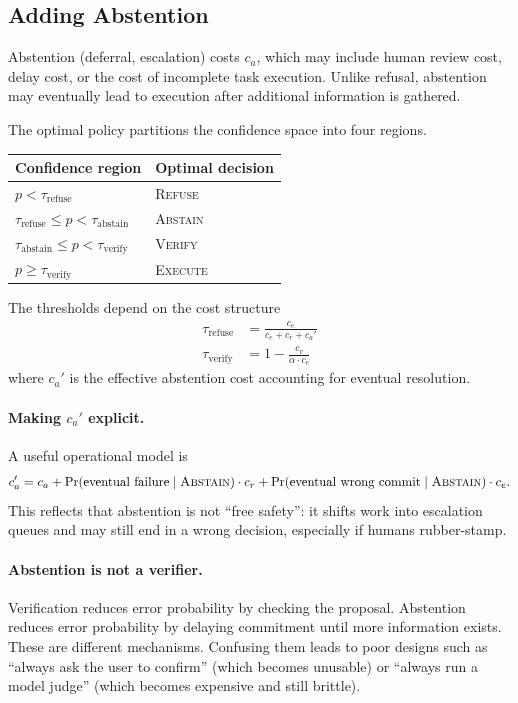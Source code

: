 \subsection{Adding Abstention}

Abstention (deferral, escalation) costs $c_a$, which may include human review cost, delay cost, or the cost of incomplete task execution. Unlike refusal, abstention may eventually lead to execution after additional information is gathered.

The optimal policy partitions the confidence space into four regions.

\begin{center}
\begin{tabular}{ll}
\toprule
Confidence region & Optimal decision \\
\midrule
$p < \tau_{\text{refuse}}$ & \textsc{Refuse} \\
$\tau_{\text{refuse}} \leq p < \tau_{\text{abstain}}$ & \textsc{Abstain} \\
$\tau_{\text{abstain}} \leq p < \tau_{\text{verify}}$ & \textsc{Verify} \\
$p \geq \tau_{\text{verify}}$ & \textsc{Execute} \\
\bottomrule
\end{tabular}
\end{center}

The thresholds depend on the cost structure
\begin{align*}
\tau_{\text{refuse}} &= \frac{c_e}{c_e + c_r + c_a'} \\
\tau_{\text{verify}} &= 1 - \frac{c_v}{\alpha \cdot c_e}
\end{align*}
where $c_a'$ is the effective abstention cost accounting for eventual resolution.

\paragraph{Making $c_a'$ explicit.}
A useful operational model is
\[
c_a' = c_a + \Pr(\text{eventual failure} \mid \textsc{Abstain}) \cdot c_r
      + \Pr(\text{eventual wrong commit} \mid \textsc{Abstain}) \cdot c_e.
\]
This reflects that abstention is not ``free safety'': it shifts work into escalation queues and may still end in a wrong decision, especially if humans rubber-stamp.

\paragraph{Abstention is not a verifier.}
Verification reduces error probability by checking the proposal. Abstention reduces error probability by delaying commitment until more information exists. These are different mechanisms. Confusing them leads to poor designs such as ``always ask the user to confirm'' (which becomes unusable) or ``always run a model judge'' (which becomes expensive and still brittle).


